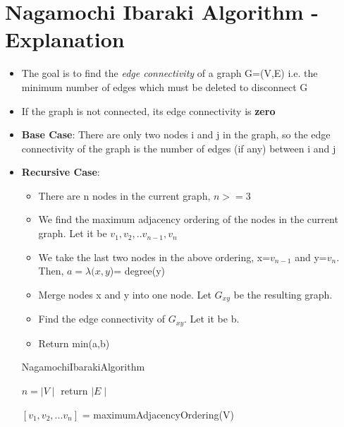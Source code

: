 \documentclass[12pt,letterpaper,titlepage,en-US]{article}
\begin{document}
\section{Nagamochi Ibaraki Algorithm - Explanation}
\begin{itemize}


\item The goal is to find the \textit{edge connectivity} of a graph G=(V,E) i.e. the minimum number of edges which must be deleted to disconnect G

\item If the graph is not connected, its edge connectivity is \textbf{zero}
\item \textbf{Base Case}: There are only two nodes i and j in the graph, so the edge connectivity of the graph  is the number of edges (if any) between i and j

\item \textbf{Recursive Case}: 
\begin{itemize}
\item There are n nodes in the current graph, $n>=3$
\item We find the maximum adjacency ordering of the nodes in the current graph. Let it be $v_{1},v_{2},..v_{n-1},v_{n}$

\item We take the last two nodes in the above ordering, x=$v_{n-1}$ and y=$v_{n}$. Then, $a=\lambda(x,y$)= degree(y)

\item Merge nodes x and y into one node. Let $G_{xy}$ be the resulting graph.

\item Find the edge connectivity of $G_{xy}$. Let it be b.

\item Return min(a,b)



\end{itemize}








\begin{algorithm}[H]
    \caption{NagamochiIbarakiAlgorithm}
    \begin{algorithmic}[1]
      
      \State $n= \mid V \mid$
      \State return $\mid E \mid$
      \EndIf
      
        
        \State $[v_{1},v_{2},...v_{n}]$ = maximumAdjacencyOrdering(V)
        

\end{algorithmic}
\end{algorithm}
\end{itemize}
\end{document}
